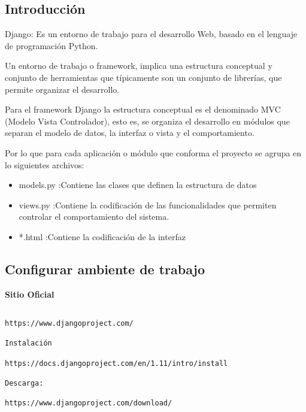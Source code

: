 \documentclass[xcolor=dvipsnames]{beamer}
\begin{document}
\subsection{Introducción}
\begin{frame}
Django: Es un entorno de trabajo para el desarrollo Web, basado en el lenguaje de programación Python.

Un entorno de trabajo o framework, implica una estructura conceptual y conjunto de herramientas que típicamente son un conjunto de librerías, que permite organizar el desarrollo.

Para el framework Django la estructura conceptual es el denominado MVC (Modelo Vista Controlador), esto es, se organiza el desarrollo en módulos que separan el modelo de datos, la interfaz o vista y el comportamiento.

Por lo que para cada aplicación o módulo que conforma el proyecto se agrupa en lo siguientes archivos:

\begin{itemize}
 \item models.py :Contiene las clases que definen la estructura de datos
 \item views.py  :Contiene la codificación de las funcionalidades que permiten controlar el comportamiento del sistema.
 \item *.html    :Contiene la codificación de la interfaz 
\end{itemize}
\end{frame}

\subsection{Configurar ambiente de trabajo}
\begin{frame}[fragile]

\begin{Large}\textbf{Sitio Oficial}\end{Large}
\begin{verbatim}

https://www.djangoproject.com/

Instalación

https://docs.djangoproject.com/en/1.11/intro/install

Descarga:

https://www.djangoproject.com/download/
\end{verbatim}
\end{frame}
\end{document}
